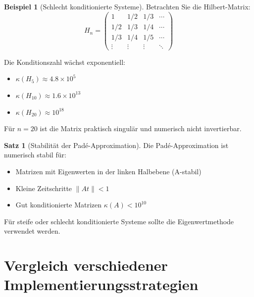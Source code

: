 ﻿\documentclass[a4paper,12pt]{report}
\theoremstyle{definition}
\newtheorem{beispiel}{Beispiel}
\newtheorem{satz}{Satz}
\begin{document}
	\begin{beispiel}[Schlecht konditionierte Systeme]
		Betrachten Sie die Hilbert-Matrix:
		\[
		H_n = \begin{pmatrix}
			1 & 1/2 & 1/3 & \cdots \\
			1/2 & 1/3 & 1/4 & \cdots \\
			1/3 & 1/4 & 1/5 & \cdots \\
			\vdots & \vdots & \vdots & \ddots
		\end{pmatrix}
		\]
		
		Die Konditionszahl wächst exponentiell:
		\begin{itemize}
			\item $\kappa(H_5) \approx 4.8 \times 10^5$
			\item $\kappa(H_{10}) \approx 1.6 \times 10^{13}$
			\item $\kappa(H_{20}) \approx 10^{18}$
		\end{itemize}
		
		Für $n = 20$ ist die Matrix praktisch singulär und numerisch nicht invertierbar.
	\end{beispiel}
	
	\begin{satz}[Stabilität der Padé-Approximation]
		Die Padé-Approximation ist numerisch stabil für:
		\begin{itemize}
			\item Matrizen mit Eigenwerten in der linken Halbebene (A-stabil)
			\item Kleine Zeitschritte $\|At\| < 1$
			\item Gut konditionierte Matrizen $\kappa(A) < 10^{10}$
		\end{itemize}
		
		Für steife oder schlecht konditionierte Systeme sollte die Eigenwertmethode verwendet werden.
	\end{satz}
	
	\section{Vergleich verschiedener Implementierungsstrategien}
	
\end{document}
